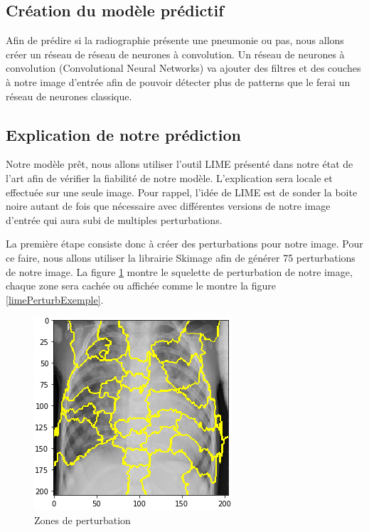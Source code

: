 \subsection{Création du modèle prédictif}
Afin de prédire si la radiographie présente une pneumonie ou pas, nous allons créer un réseau de réseau de neurones à convolution. Un réseau de neurones à convolution (Convolutional Neural Networks) va ajouter des filtres et des couches à notre image d'entrée afin de pouvoir détecter plus de patterns que le ferai un réseau de neurones classique.

\subsection{Explication de notre prédiction}
Notre modèle prêt, nous allons utiliser l'outil LIME présenté dans notre état de l'art afin de vérifier la fiabilité de notre modèle. L'explication sera locale et effectuée sur une seule image. Pour rappel,  l’idée de LIME est de sonder la boite noire autant de fois que nécessaire avec différentes versions de notre image d'entrée qui aura subi de multiples perturbations.\par
La première étape consiste donc à créer des perturbations pour notre image. Pour ce faire, nous allons utiliser la librairie Skimage afin de générer 75 perturbations de notre image. La figure \ref{limePerturbSchema} montre le squelette de perturbation de notre image, chaque zone sera cachée ou affichée comme le montre la figure \ref{limePerturbExemple}.\par
\begin{figure}[h]
    \includegraphics[scale=0.6]{src_img/limePerturbSchema.png}
    \caption{Zones de perturbation}
    \label{limePerturbSchema}
\end{figure}

